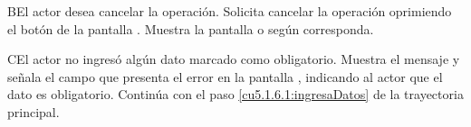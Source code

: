  \begin{UCtrayectoriaA}{B}{El actor desea cancelar la operación.}
    \UCpaso[\UCactor] Solicita cancelar la operación oprimiendo el botón  de la pantalla .
    \UCpaso[\UCsist] Muestra la pantalla  o  según corresponda.
 \end{UCtrayectoriaA}
 
 \begin{UCtrayectoriaA}{C}{El actor no ingresó algún dato marcado como obligatorio.}
    \UCpaso[\UCsist] Muestra el mensaje  y señala el campo que presenta el error en la pantalla , indicando al actor que el dato es obligatorio.
    \UCpaso[] Continúa con el paso \ref{cu5.1.6.1:ingresaDatos} de la trayectoria principal.
 \end{UCtrayectoriaA}
 

